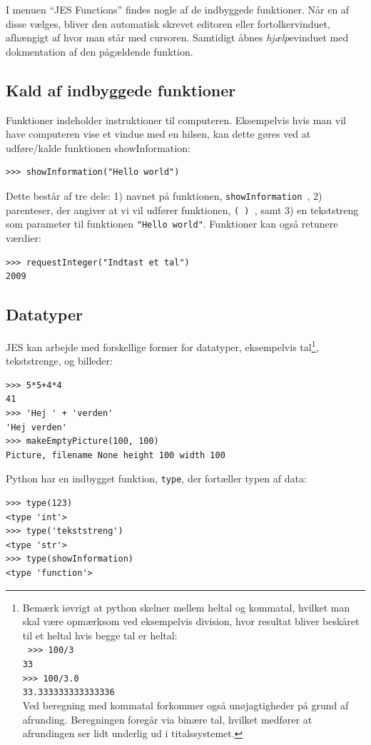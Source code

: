 \documentclass[10pt]{article}
\begin{document}
I menuen ``JES Functions'' findes nogle af de indbyggede funktioner. Når en af disse vælges, bliver den automatisk skrevet editoren eller fortolkervinduet, afhængigt af hvor man står med cursoren. Samtidigt åbnes \emph{hjælp}evinduet med dokmentation af den pågældende funktion.

\subsection{Kald af indbyggede funktioner}
Funktioner indeholder instruktioner til computeren. Eksempelvis hvis man vil have computeren vise et vindue med en hilsen, kan dette gøres ved at udføre/kalde funktionen showInformation:
\begin{verbatim}
>>> showInformation("Hello world")
\end{verbatim}
Dette består af tre dele: 1) navnet på funktionen, {\tt showInformation }, 2) parenteser, der angiver at vi vil udfører funktionen, {\tt ( ) }, samt 3) en tekststreng som parameter til funktionen \verb|"Hello world"|. 
Funktioner kan også retunere værdier:
\begin{verbatim}
>>> requestInteger("Indtast et tal")
2009
\end{verbatim}

\subsection{Datatyper}

JES kan arbejde med forskellige former for datatyper,
eksempelvis tal\footnote{
Bemærk iøvrigt at python skelner mellem heltal og kommatal, hvilket man skal være opmærksom ved eksempelvis division, hvor resultat bliver beskåret til et heltal hvis begge tal er heltal: \\
{ \tt
>>> 100/3\\
33\\
>>> 100/3.0\\
33.333333333333336}\\
Ved beregning med kommatal forkommer også unøjagtigheder på grund af afrunding. Beregningen foregår via binære tal, hvilket medfører at afrundingen ser lidt underlig ud i titalssystemet.
}, tekststrenge, og billeder:
\begin{verbatim}
>>> 5*5+4*4
41
>>> 'Hej ' + 'verden'
'Hej verden'
>>> makeEmptyPicture(100, 100)
Picture, filename None height 100 width 100
\end{verbatim}

Python har en indbygget funktion, \verb|type|, der fortæller typen af data:
\begin{verbatim}
>>> type(123)
<type 'int'>
>>> type('tekststreng')
<type 'str'>
>>> type(showInformation)
<type 'function'>
\end{verbatim}
\end{document}
